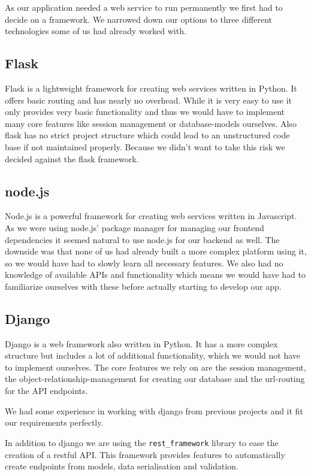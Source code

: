 As our application needed a web service to run permanently we first had
to decide on a framework. We narrowed down our options to three
different technologies some of us had already worked with.

\subsection{Flask}\label{flask}

Flask is a lightweight framework for creating web services written in
Python. It offers basic routing and has nearly no overhead. While it is
very easy to use it only provides very basic functionality and thus we
would have to implement many core features like session management or
database-models ourselves. Also flask has no strict project structure
which could lead to an unstructured code base if not maintained
properly. Because we didn't want to take this risk we decided against
the flask framework.

\subsection{node.js}\label{node.js}

Node.js is a powerful framework for creating web services written in
Javascript. As we were using node.js' package manager for managing our
frontend dependencies it seemed natural to use node.js for our backend
as well. The downside was that none of us had already built a more
complex platform using it, so we would have had to slowly learn all
necessary features. We also had no knowledge of available APIs and
functionality which means we would have had to familiarize ourselves
with these before actually starting to develop our app.

\subsection{Django}\label{django}

Django is a web framework also written in Python. It has a more complex
structure but includes a lot of additional functionality, which we would
not have to implement ourselves. The core features we rely on are the
session management, the object-relationship-management for creating our
database and the url-routing for the API endpoints.

We had some experience in working with django from previous projects and
it fit our requirements perfectly.

In addition to django we are using the \texttt{rest\_framework} library
to ease the creation of a restful API. This framework provides features
to automatically create endpoints from models, data serialisation and
validation.


